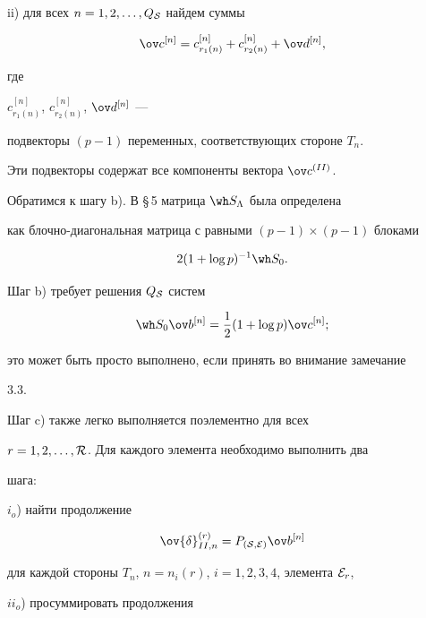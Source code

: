ii) для всех $n=1,2,\dotsc,Q_{\cal S}$ найдем суммы


$$


\ov c^{[n]}=c^{[n]}_{r_1(n)}+c^{[n]}_{r_2(n)}+\ov d^{[n]},


$$


где 


$c^{[n]}_{r_1(n)}$, $c^{[n]}_{r_2(n)}$, $\ov d^{[n]}$ ---


подвекторы $(p-1)$ переменных, соответствующих стороне $T_n$. 


Эти подвекторы содержат все компоненты вектора $\ov c^{(II)}$.





Обратимся к шагу b). В \S\,5 матрица $\wh S_{\Lambda}$ была определена 


как блочно-диагональная матрица с равными $(p-1)\times(p-1)$ блоками


$$


2(1+\log p)^{-1}\wh S_0.


$$


Шаг b) требует решения $Q_{\cal S}$ систем


\begin{equation}


\wh S_0 \ov b^{[n]}=\frac{1}{2}(1+\log p)\ov c^{[n]};


\label{7.13}


\end{equation}


это может быть просто выполнено, если принять во внимание замечание 


3.3.





Шаг c) также легко выполняется поэлементно для всех 


$r=1,2,\dotsc,{\cal R}$. Для каждого элемента необходимо выполнить два 


шага:





$i_o$) найти продолжение


$$


\ov {\delta}^{(r)}_{II,n}=P_{({\cal S,E})} \ov b^{[n]}


$$ 


для каждой стороны $T_n$, $n=n_i(r)$, $i=1,2,3,4$, элемента ${\cal E}_r$,





$ii_o$) просуммировать продолжения


